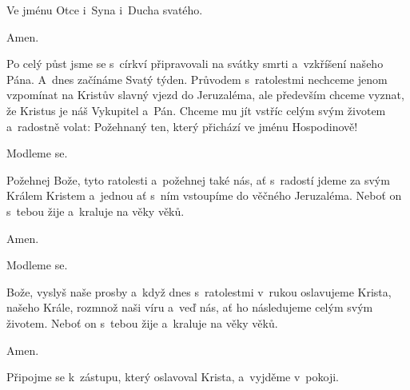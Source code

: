 \mbox{}

\Vbardot{} Ve jménu Otce \grecross{} i~Syna i~Ducha svatého.

\Rbardot{} Amen.

Po celý půst jsme se s~církví připravovali na svátky smrti a~vzkříšení našeho Pána. A~dnes začínáme Svatý týden. Průvodem s~ratolestmi nechceme jenom vzpomínat na Kristův slavný vjezd do Jeruzaléma, ale především chceme vyznat, že Kristus je náš Vykupitel a~Pán. Chceme mu jít vstříc celým svým ži\-votem a~radostně volat: Požehnaný ten, který přichází ve jménu Hospodinově!

\mbox{}

Modleme se.

Požehnej \grecross{} Bože, tyto ratolesti a~požehnej také nás, ať s~radostí jdeme za svým Králem Kristem a~jednou ať s~ním vstoupíme do věčného Jeruzaléma. Neboť on s~tebou žije a~kraluje na věky věků.

\Rbardot{} Amen.

\mbox{}

Modleme se.

Bože, vyslyš naše prosby a~když dnes s~ratolestmi v~rukou oslavujeme Krista, našeho Krále, rozmnož naši víru a~veď nás, ať ho následujeme celým svým životem. Neboť on s~tebou žije a~kraluje na věky věků.

\Rbardot{} Amen.

\mbox{}

Připojme se k~zástupu, který oslavoval Krista, a~vyjděme v~pokoji.
